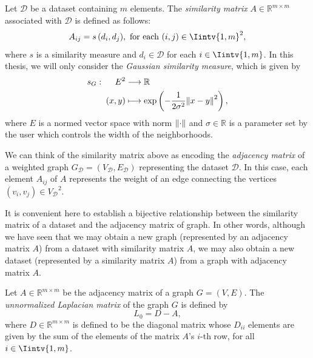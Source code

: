 \begin{definition}
   Let $\mathcal D$ be a dataset containing $m$ elements. The \textit{similarity matrix} $A \in \mathbb{R}^{m \times m}$ associated with $\mathcal D$ is defined as follows: 
   \begin{equation}
      A_{ij} = s\,(d_i,d_j), \text{ for each } (i,j) \in \Iintv{1,m}^2,
   \end{equation}
   where $s$ is a similarity measure and $d_i \in \mathcal D$ for each $i \in \Iintv{1,m}$.
   In this thesis, we will only consider the \textit{Gaussian similarity measure}, which is given by 
   \begin{equation}
      \begin{split}
         s_G:\,\,\,\,\,\,\,\,   E^2  &\longrightarrow \mathbb R  \\
          (x, y) & \longmapsto \exp \left( -\frac{1}{2 \sigma ^2} {\left\lVert x - y\right\rVert}^2 \right),
      \end{split}
   \end{equation}
   where $E$ is a normed vector space with norm $\left\lVert\cdot\right\rVert$ and $\sigma \in \mathbb R$ is a parameter set by the user which controls the width of the neighborhoods.
\end{definition}

We can think of the similarity matrix above as encoding the \textit{adjacency matrix} of a weighted graph $G_{\mathcal D} = (V_{\mathcal D}, E_{\mathcal D})$ representing the dataset $\mathcal D$. 
In this case, each element $A_{ij}$ of $A$ represents the weight of an edge connecting the vertices $(v_i, v_j) \in {V_{\mathcal D}}^2$.

\begin{remark}
It is convenient here to establish a bijective relationship between the similarity matrix of a dataset and the adjacency matrix of graph.
   In other words, although we have seen that we may obtain a new graph (represented by an adjacency matrix $A$) from a dataset with similarity matrix $A$, we may also obtain a new dataset (represented by a similarity matrix $A$) from a graph with adjacency matrix $A$.
\end{remark}

\begin{definition}
   Let $A \in \mathbb R ^{m \times m}$ be the adjacency matrix of a graph $G = (V, E)$. The \textit{unnormalized Laplacian matrix} of the graph $G$ is defined by
   \begin{equation}
      L_0 = D - A,
   \end{equation}
   where $D \in \mathbb R ^{m \times m}$ is defined to be the diagonal matrix whose $D_{ii}$ elements are given by the sum of the elements of the matrix $A$'s $i$-th row, for all $i \in \Iintv{1,m}$.
\end{definition}

